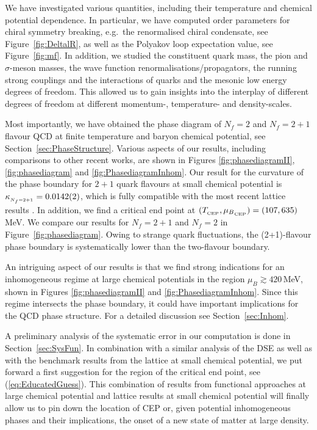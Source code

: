 \documentclass[%
reprint,
superscriptaddress,
showpacs,preprintnumbers,
 amsmath,amssymb,
 aps,
prd,
]{revtex4-1}
\def\eq#1{(\ref{#1})}
\def\fig#1{Figure~\ref{#1}}
\def\sec#1{Section~\ref{#1}}
\begin{document}
We have investigated various quantities, including their temperature
and chemical potential dependence.  In particular, we have computed
order parameters for chiral symmetry breaking, e.g.\ the renormalised
chiral condensate, see \fig{fig:DeltalR}, as well as the Polyakov loop
expectation value, see \fig{fig:mf}. In addition, we studied the
constituent quark mass, the pion and $\sigma$-meson masses, the wave
function renormalisations/propagators, the running strong couplings
and the interactions of quarks and the mesonic low energy degrees of
freedom. This allowed us to gain insights into the interplay of
different degrees of freedom at different momentum-, temperature- and
density-scales.
  
Most importantly, we have obtained the phase diagram of $N_f = 2$ and
$N_f = 2 + 1$ flavour QCD at finite temperature and baryon chemical
potential, see \sec{sec:PhaseStructure}. Various aspects of our
results, including comparisons to other recent works, are shown in
Figures \ref{fig:phasediagramII}, \ref{fig:phasediagram} and
\ref{fig:PhasediagramInhom}. Our result for the curvature of the phase
boundary for $2 \!+\! 1$ quark flavours at small chemical potential is
$\kappa_{_{\tiny{N_f=2+1}}}=0.0142(2)$, which is fully compatible with
the most recent lattice results \cite{Bellwied:2015rza,
  Bazavov:2018mes}. In addition, we find a critical end point at
$(T_{_{\tiny{\text{CEP}}}},{\mu_B}_{_{\tiny{\text{CEP}}}})=(107,
635)$\,MeV.  We compare our results for $N_f = 2 + 1$ and $N_f = 2$ in
\fig{fig:phasediagram}. Owing to strange quark fluctuations, the
(2+1)-flavour phase boundary is systematically lower than the
two-flavour boundary.

An intriguing aspect of our results is that we find strong indications
for an inhomogeneous regime at large chemical potentials in the region
$\mu_B\gtrsim 420$\,MeV, shown in Figures \ref{fig:phasediagramII} and
\ref{fig:PhasediagramInhom}. Since this regime intersects the phase
boundary, it could have important implications for the QCD phase
structure. For a detailed discussion see \sec{sec:Inhom}.

A preliminary analysis of the systematic error in our computation is
done in \sec{sec:SysFun}. In combination with a similar analysis of
the DSE as well as with the benchmark results from the lattice at
small chemical potential, we put forward a first suggestion for the
region of the critical end point, see \eq{eq:EducatedGuess}. This
combination of results from functional approaches at large chemical
potential and lattice results at small chemical potential will finally
allow us to pin down the location of CEP or, given potential
inhomogeneous phases and their implications, the onset of a new state
of matter at large density.
\end{document}
